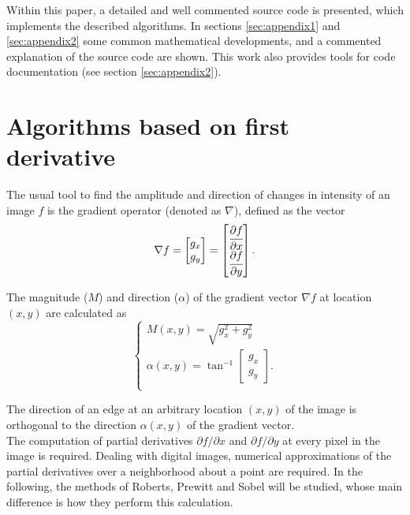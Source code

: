 \documentclass{ipol}
\numberwithin{equation}{section}
\numberwithin{table}{section}
\numberwithin{figure}{section}
\begin{document}
Within this paper, a detailed and well commented source code is presented, which 
implements the described algorithms. In sections \ref{sec:appendix1} 
and \ref{sec:appendix2} some common mathematical developments, and a commented 
explanation of the source code are shown. This work also provides tools for code documentation 
(see section \ref{sec:appendix2}). 

\nocite{IPOL}


\section{Algorithms based on first derivative}
\label{sec:first}

The usual tool to find the amplitude and direction of changes in 
intensity of an image $f$ is the gradient operator (denoted as $\nabla$), defined 
as the vector
\begin{equation}
	\nabla f = 
				\begin{bmatrix} 
					g_x \\ g_y
				\end{bmatrix}
	=				
				\begin{bmatrix} 
					\cfrac{\partial f}{\partial x} \\ \cfrac{\partial f}{\partial y} \\
				\end{bmatrix}.
\end{equation}

The magnitude ($M$) and direction ($\alpha$) of the gradient vector $\nabla f$ at location $(x,y)$
are calculated as
\begin{equation}
\label{eq:mag_alpha}
	\begin{cases}
		M(x,y) = \sqrt{g_x^2 + g_y^2} \\
		\alpha(x,y) = \tan^{-1} \begin{bmatrix} g_x \\ g_y \end{bmatrix} .\\
	\end{cases}
\end{equation}

The direction of an edge at an arbitrary location $(x,y)$ of the image is 
orthogonal to the direction $\alpha(x,y)$ of the gradient vector.\\

The computation of partial derivatives $\partial f/\partial x$ and $\partial f/\partial y$ 
at every pixel in the image is required. Dealing with digital images, numerical approximations 
of the partial derivatives over a neighborhood about a point are required. In the following,
the methods of Roberts, Prewitt and Sobel will be studied, whose main difference is how they perform this calculation. 
\end{document}
